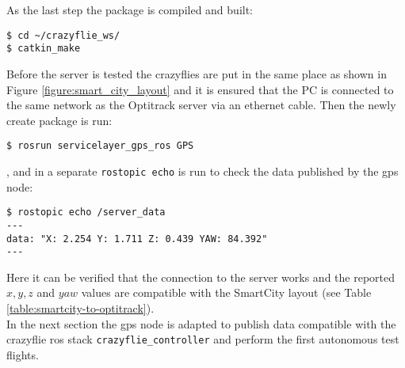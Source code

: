 \noindent As the last step the package is compiled and built:
\begin{mdframed}[backgroundcolor=light-gray, linecolor=light-gray]
\begin{verbatim}
$ cd ~/crazyflie_ws/
$ catkin_make
\end{verbatim}
\end{mdframed}

Before the server is tested the crazyflies are put in the same place as shown in Figure \ref{figure:smart_city_layout} and it is ensured that the PC is connected to the same network as the Optitrack server via an ethernet cable. Then the newly create package is run:
\begin{mdframed}[backgroundcolor=light-gray, linecolor=light-gray]
\begin{verbatim}
$ rosrun servicelayer_gps_ros GPS
\end{verbatim}
\end{mdframed}
\noindent , and in a separate \texttt{rostopic echo} is run to check the data published by the gps node:
\begin{mdframed}[backgroundcolor=light-gray, linecolor=light-gray]
\begin{verbatim}
$ rostopic echo /server_data
---
data: "X: 2.254 Y: 1.711 Z: 0.439 YAW: 84.392"
---
\end{verbatim}
\end{mdframed}
\noindent Here it can be verified that the connection to the server works and the reported $x, y, z$ and $yaw$ values are compatible with the SmartCity layout (see Table \ref{table:smartcity-to-optitrack}).\\

\noindent In the next section the gps node is adapted to publish data compatible with the crazyflie ros stack \texttt{crazyflie\_controller} and perform the first autonomous test flights.